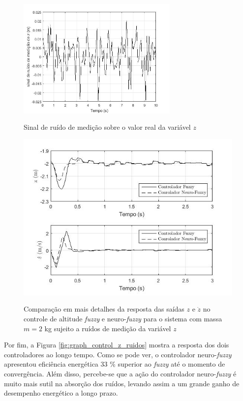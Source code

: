 \begin{figure}[!htb]
    \centering
    \caption{Sinal de ruído de medição sobre o valor real da variável $z$}
    \includegraphics[width=0.7\textwidth]{./04-figuras/figuras_pos_banca/7-altitude2kg_ruido/graph_sinal_ruidos}
    \label{fig:graph_sinal_ruidos}
\end{figure}

\begin{figure}[!htb]
    \centering
    \caption{Comparação em mais detalhes da resposta das saídas $z$ e $\dot{z}$ no controle de altitude \textit{fuzzy} e neuro-\textit{fuzzy} para o sistema com massa $m=2$ kg sujeito a ruídos de medição da variável $z$}
    \includegraphics[width=1\textwidth]{./04-figuras/figuras_pos_banca/7-altitude2kg_ruido/graph_z_zdot_2kg_details_ruidos}
    \label{fig:graph_z_zdot_2kg_details_ruidos}
\end{figure}

Por fim, a Figura \ref{fig:graph_control_z_ruidos} mostra a resposta dos dois controladores ao longo tempo. Como se pode ver, o controlador neuro-\textit{fuzzy} apresentou eficiência energética 33 \% superior ao \textit{fuzzy} até o momento de convergência. Além disso, percebe-se que a ação do controlador neuro-\textit{fuzzy} é muito mais sutil na absorção dos ruídos, levando assim a um grande ganho de desempenho energético a longo prazo.

